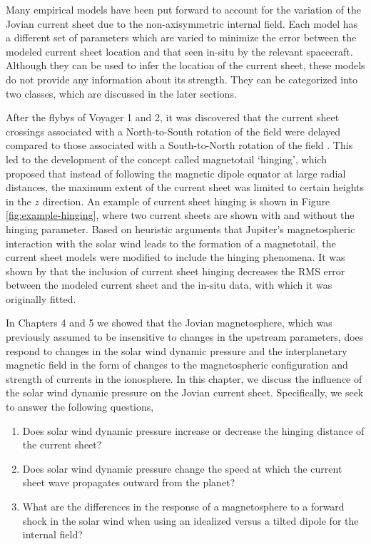 Many empirical models have been put forward to account for the variation of the Jovian current sheet due to the non-axisymmetric internal field. Each model has a different set of parameters which are varied to minimize the error between the modeled current sheet location and that seen in-situ by the relevant spacecraft. Although they can be used to infer the location of the current sheet, these models do not provide any information about its strength. They can be categorized into two classes, which are discussed in the later sections. 

 After the flybys of Voyager 1 and 2, it was discovered that the current sheet crossings associated with a North-to-South rotation of the field were delayed compared to those associated with a South-to-North rotation of the field \cite{Behannon1981}. This led to the development of the concept called magnetotail `hinging', which proposed that instead of following the magnetic dipole equator at large radial distances, the maximum  extent of the current sheet was limited to certain heights in the $z$ direction. An example of current sheet hinging is shown in Figure \ref{fig:example-hinging}, where two current sheets are shown with and without the hinging parameter. Based on heuristic arguments that Jupiter's  magnetospheric interaction with the solar wind leads to the formation of a magnetotail, the current sheet models were modified to include the hinging phenomena. It was shown by  that the inclusion of current sheet hinging decreases the RMS error between the modeled current sheet and the in-situ data, with which it was originally fitted.

In Chapters 4 and 5 we showed that the Jovian magnetosphere, which was previously assumed to be insensitive to changes in the upstream parameters, does respond to changes in the solar wind dynamic pressure and the interplanetary magnetic field in the form of changes to the magnetospheric configuration and strength of currents in the ionosphere. In this chapter, we discuss the influence of the solar wind dynamic pressure on the Jovian current sheet. Specifically, we seek to answer the following questions,

\begin{enumerate}
    \item Does solar wind dynamic pressure increase or decrease the hinging distance of the current sheet?
    \item Does solar wind dynamic pressure change the speed at which the current sheet wave propagates outward from the planet?
    \item What are the differences in the response of a magnetosphere to a forward shock in the solar wind when using an idealized versus a tilted dipole for the internal field?
\end{enumerate}


